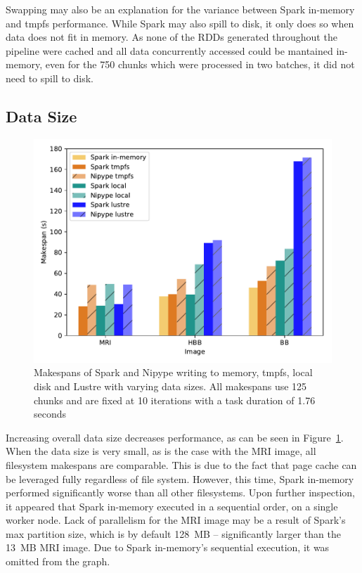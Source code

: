 \documentclass{IEEEtran}
\begin{document}
Swapping may also be an explanation for the variance between Spark in-memory 
and tmpfs performance. While Spark may also spill to disk, it only does so when
data does not fit in memory. As none of the RDDs generated throughout the 
pipeline were cached and all data concurrently accessed could be mantained 
in-memory, even for the 750 chunks which were processed in two batches, it did 
not need to spill to disk.

\subsection{Data Size}
\begin{figure}[h]
    \centering
    \includegraphics[width=\linewidth]{results/figures/datasize.pdf}
    \caption{Makespans of Spark and Nipype writing to memory, tmpfs, local 
             disk and Lustre with varying data sizes. All 
             makespans use 125 chunks and are fixed at 
             10 iterations with a task duration of 1.76 
             seconds }\label{fig:datasize}
\end{figure}
Increasing overall data size decreases performance, as can be seen in 
Figure~\ref{fig:datasize}. When the data size is very small, as is the case 
with the MRI image, all filesystem makespans are comparable. This is due to the 
fact that page cache can be leveraged fully regardless of file system. However, 
this time, Spark in-memory performed significantly worse than all other 
filesystems. Upon further inspection, it appeared that Spark in-memory executed
in a sequential order, on a single worker node. Lack of parallelism for the MRI 
image may be a result of Spark's max partition size, which is by default 128~MB
-- significantly larger than the 13~MB MRI image. Due to Spark in-memory's 
sequential execution, it was omitted from the graph.
\end{document}
